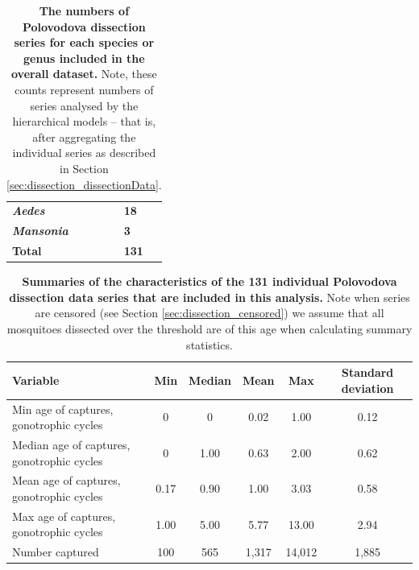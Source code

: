 \documentclass[12pt]{article}
\begin{document}
{\begin{table}[htbp]
\begin{tabular}{lll}
		\textit{\textbf{Aedes}} &       & \textbf{18} \\
		\textit{\textbf{Mansonia}} &       & \textbf{3} \\
		\bottomrule
		\textbf{Total} &  & \textbf{131} \\
	\end{tabular}%
	\caption{\textbf{The numbers of Polovodova dissection series for each species or genus included in the overall dataset.} Note, these counts represent numbers of series analysed by the hierarchical models -- that is, after aggregating the individual series as described in Section \ref{sec:dissection_dissectionData}.}\label{tab:dissection_speciesNumbers}%
\end{table}%


\begin{table}[htbp]
	\centering
	\footnotesize
	\begin{adjustwidth}{-0.3in}{-0.3in}%
		\begin{tabularx}{1.1\textwidth}{l|ccccc}
			\toprule
			\textbf{Variable} & \textbf{Min} & \textbf{Median} & \textbf{Mean} & \textbf{Max} & \textbf{Standard deviation} \\
			\midrule
			Min age of captures, gonotrophic cycles & 0  & 0  & 0.02  & 1.00  & 0.12 \\
			Median age of captures, gonotrophic cycles & 0  & 1.00  & 0.63  & 2.00  & 0.62 \\
			Mean age of captures, gonotrophic cycles & 0.17  & 0.90  & 1.00  & 3.03  & 0.58 \\
			Max age of captures, gonotrophic cycles & 1.00  & 5.00  & 5.77  & 13.00 & 2.94 \\
			Number captured & 100 & 565 & 1,317 & 14,012 & 1,885 \\
			\bottomrule
		\end{tabularx}%
	\end{adjustwidth}
	\caption{\textbf{Summaries of the characteristics of the 131 individual Polovodova dissection data series that are included in this analysis.} Note when series are censored (see Section \ref{sec:dissection_censored}) we assume that all mosquitoes dissected over the threshold are of this age when calculating summary statistics.}\label{tab:dissection_summaryStats}
\end{table}

}
\end{document}
